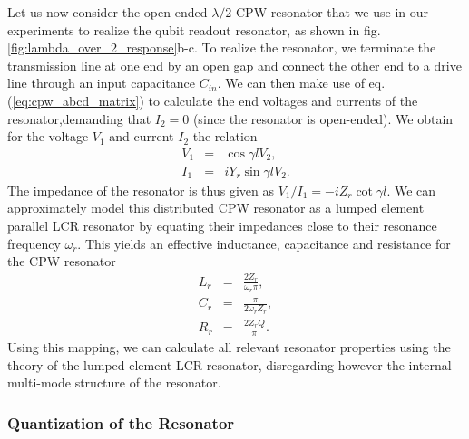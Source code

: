 Let us now consider the open-ended $\lambda / 2$ CPW resonator that we use in our experiments to realize the qubit readout resonator, as shown in fig. \ref{fig:lambda_over_2_response}b-c. To realize the resonator, we terminate the transmission line at one end by an open gap and connect the other end to a drive line through an input capacitance $C_{in}$. We can then make use of eq. (\ref{eq:cpw_abcd_matrix}) to calculate the end voltages and currents of the resonator,demanding that $I_2=0$ (since the resonator is open-ended). We obtain for the voltage $V_1$ and current $I_2$ the relation
%
\begin{eqnarray}
V_1 & = & \cos{\gamma l} V_2, \\
I_1 & = & i Y_r \sin{\gamma l} V_2.
\end{eqnarray}
%
The impedance of the resonator is thus given as $V_1/I_1 = -i Z_r \cot{\gamma l}$. We can approximately model this distributed CPW resonator as a lumped element parallel LCR resonator by equating their impedances close to their resonance frequency $\omega_r$. This yields an effective inductance, capacitance and resistance for the CPW resonator
%
\begin{eqnarray}
L_{r} & = & \frac{2 Z_r}{\omega_r \pi}, \\
C_{r} & = & \frac{\pi}{2\omega_r Z_r}, \\
R_{r} & = & \frac{2 Z_r Q}{\pi}.
\end{eqnarray}
%
Using this mapping, we can calculate all relevant resonator properties using the theory of the lumped element LCR resonator, disregarding however the internal multi-mode structure of the resonator.

\subsubsection{Quantization of the Resonator}

